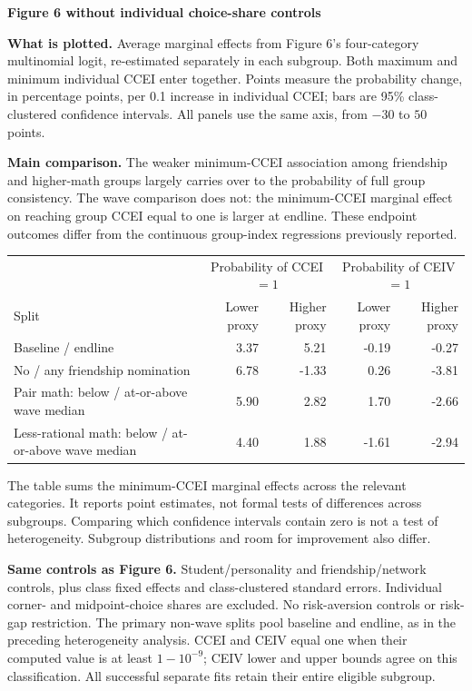 \documentclass[11pt]{article}
\begin{document}
\begin{center}\Large\textbf{Figure 6 without individual choice-share controls}\end{center}
\textbf{What is plotted.} Average marginal effects from Figure 6's four-category multinomial logit,
re-estimated separately in each subgroup. Both maximum and minimum individual CCEI enter together.
Points measure the probability change, in percentage points, per 0.1 increase in individual CCEI;
bars are 95\% class-clustered confidence intervals. All panels use the same axis, from $-30$ to $50$ points.

\textbf{Main comparison.} The weaker minimum-CCEI association among friendship and higher-math groups
largely carries over to the probability of full group consistency. The wave comparison does not:
the minimum-CCEI marginal effect on reaching group CCEI equal to one is larger at endline.
These endpoint outcomes differ from the continuous group-index regressions previously reported.

\begin{center}\small
\begin{tabular}{lrrrr}\toprule
& \multicolumn{2}{c}{Probability of CCEI $=1$} & \multicolumn{2}{c}{Probability of CEIV $=1$}\\
Split & Lower proxy & Higher proxy & Lower proxy & Higher proxy\\\midrule
Baseline / endline & 3.37 & 5.21 & -0.19 & -0.27\\
No / any friendship nomination & 6.78 & -1.33 & 0.26 & -3.81\\
Pair math: below / at-or-above wave median & 5.90 & 2.82 & 1.70 & -2.66\\
Less-rational math: below / at-or-above wave median & 4.40 & 1.88 & -1.61 & -2.94\\
\bottomrule\end{tabular}\end{center}
\small
The table sums the minimum-CCEI marginal effects across the relevant categories. It reports point estimates,
not formal tests of differences across subgroups. Comparing which confidence intervals contain zero is not a test
of heterogeneity. Subgroup distributions and room for improvement also differ.

\textbf{Same controls as Figure 6.} Student/personality and friendship/network controls,
plus class fixed effects and class-clustered standard errors. Individual corner- and midpoint-choice shares are excluded. No risk-aversion controls or risk-gap restriction.
The primary non-wave splits pool baseline and endline, as in the preceding heterogeneity analysis.
CCEI and CEIV equal one when their computed value is at least $1-10^{-9}$; CEIV lower and upper bounds agree
on this classification. All successful separate fits retain their entire eligible subgroup.
\end{document}
